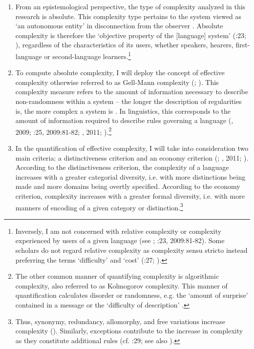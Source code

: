 \documentclass[output=paper]{langscibook}
\begin{document}
\begin{enumerate}
\item
From an epistemological perspective, the type of complexity analyzed in this research is absolute. This complexity type pertains to the system viewed as ‘an autonomous entity’ in disconnection from the observer \citep[4]{Kusters2008}. Absolute complexity is therefore the ‘objective property of the [language] system’ (\citealt{Miestamo2008}:23; \citealt{Dahl2004}), regardless of the characteristics of its users, whether speakers, hearers, first-language or second-language learners.\footnote{Inversely, I am not concerned with relative complexity or complexity experienced by users of a given language (see \citealt{Kusters2003}; \citealt{Miestamo2008}:23, 2009:81-82). Some scholars do not regard relative complexity as complexity sensu stricto \citep[39-40]{Dahl2004} instead preferring the terms ‘difficulty’ and ‘cost’ (\citealt{Miestamo2008}:27; \citealt{Lindström2008}).}

\item
To compute absolute complexity, I will deploy the concept of effective complexity otherwise referred to as Gell-Mann complexity (\citealt{Gell-Mann1995}; \citealt{Gell-MannLloyd2004}). This complexity measure refers to the amount of information necessary to describe non-randomness within a system – the longer the description of regularities is, the more complex a system is \citep[99]{Mitchell2009}. In linguistics, this corresponds to the amount of information required to describe rules governing a language (\citealt{McWhorter2005,20072005}, 2009; \citealt{Miestamo2008}:25, 2009:81-82; \citealt{Sinnemäki2008,20092008}, 2011; \citealt{Parkvall2008}).\footnote{The other common manner of quantifying complexity is algorithmic complexity, also referred to as Kolmogorov complexity. This manner of quantification calculates disorder or randomness, e.g. the ‘amount of surprise’ contained in a message \citep[97-98]{Mitchell2009} or the ‘difficulty of description’ \citep[52]{Shalizi2006}.}

\item
In the quantification of effective complexity, I will take into consideration two main criteria: a distinctiveness criterion and an economy criterion (\citealt{Miestamo2006a,20082006a}; \citealt{Sinnemäki2008,20092008}, 2011; \citealt{Parkvall2008}). According to the distinctiveness criterion, the complexity of a language increases with a greater categorial diversity, i.e. with more distinctions being made and more domains being overtly specified. According to the economy criterion, complexity increases with a greater formal diversity, i.e. with more manners of encoding of a given category or distinction.\footnote{Thus, synonymy, redundancy, allomorphy, and free variations increase complexity (\citealt{McWhorter2007,20082007}). Similarly, exceptions contribute to the increase in complexity as they constitute additional rules (cf. \citealt{Hammarström2008}:29; see also \citealt{McWhorter2007,20082007}).} 


\end{enumerate}
\end{document}
